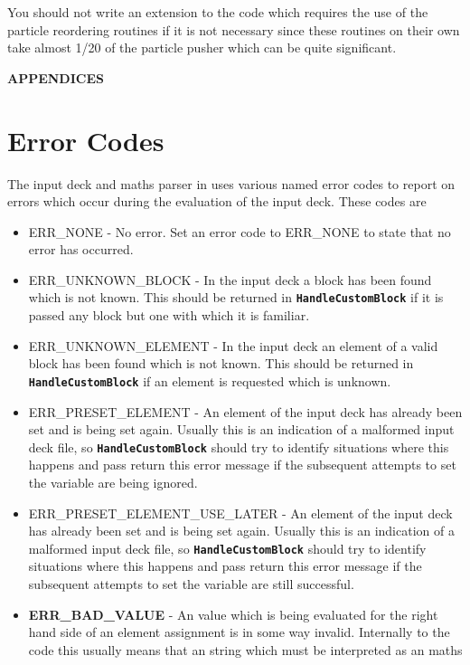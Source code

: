 \documentclass[12pt,a4paper]{article}
\newcommand{\inlinecode}[1]{{\color{warwickred} \bf\texttt{#1}}}
\newcommand{\EPOCH}{{\color{warwickdark}\fontfamily{phv}\selectfont{EPOCH}}}
\begin{document}
You should not write an extension to the code which requires the use of the
particle reordering routines if it is not necessary since these routines on
their own take almost 1/20 of the particle pusher which can be quite
significant.

\pagebreak

\appendix
  \begin{center}
    {\bf APPENDICES}
  \end{center}
\section{Error Codes}
The input deck and maths parser in {\EPOCH} uses various named error codes to
report on errors which occur during the evaluation of the input deck. These
codes are
\begin{itemize}
\item ERR\_NONE - No error. Set an error code to ERR\_NONE to state that no
  error has occurred.
\item ERR\_UNKNOWN\_BLOCK - In the input deck a block has been found which is
  not known. This should be returned in \inlinecode{HandleCustomBlock} if it is
  passed any block but one with which it is familiar.
\item ERR\_UNKNOWN\_ELEMENT - In the input deck an element of a valid block has
  been found which is not known. This should be returned in
  \inlinecode{HandleCustomBlock} if an element is requested which is unknown.
\item ERR\_PRESET\_ELEMENT - An element of the input deck has already been set
  and is being set again. Usually this is an indication of a malformed input
  deck file, so \inlinecode{HandleCustomBlock} should try to identify
  situations where this happens and pass return this error message if the
  subsequent attempts to set the variable are being ignored.
\item ERR\_PRESET\_ELEMENT\_USE\_LATER - An element of the input deck has
  already been set and is being set again. Usually this is an indication of a
  malformed input deck file, so \inlinecode{HandleCustomBlock} should try to
  identify situations where this happens and pass return this error message if
  the subsequent attempts to set the variable are still successful.
\item {\bf ERR\_BAD\_VALUE} - An value which is being evaluated for the right
  hand side of an element assignment is in some way invalid. Internally to the
  code this usually means that an string which must be interpreted as an maths

\end{itemize}
\end{document}

